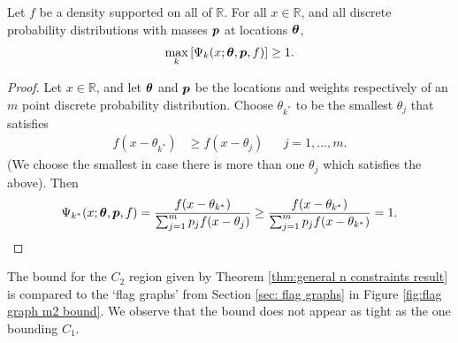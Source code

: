 
		\begin{lemma}
		\label{lem:maxkGamma}
		Let $f$ be a density supported on all of $\mathbb{R}$. For all $x \in \mathbb{R}$, and all discrete probability distributions with masses ${\bm{{p}}}$ at locations ${\bm{{\theta}}}$,
			\begin{equation}
				\max_k \left[ \Psi_k(x;{\bm{{\theta}}},{\bm{{p}}},f) \right] \geq 1.
			\end{equation}
		\end{lemma}	
		\begin{proof}
			Let $x \in \mathbb{R}$, and let ${\bm{{\theta}}}$ and ${\bm{{p}}}$ be the locations and weights respectively of an $m$ point discrete probability distribution. Choose $\theta_{k^*}$ to be the smallest $\theta_j$ that satisfies
			\begin{align}
				f(x - \theta_{k^*}) &\geq f(x - \theta_j) && j = 1, \dots, m.
			\end{align}
			(We choose the smallest in case there is more than one $\theta_j$ which satisfies the above). Then
			\begin{equation}
				\Psi_{k^*}(x;{\bm{{\theta}}},{\bm{{p}}},f) = \frac{f(x - \theta_{k^*})}{\sum_{j=1}^m p_j f(x - \theta_j)} \geq \frac{f(x - \theta_{k^*})}{\sum_{j=1}^m p_j f(x - \theta_{k^*})} = 1.
			\end{equation}
		\end{proof}

		The bound for the $C_2$ region given by Theorem \ref{thm:general n constraints result} is compared to the `flag graphs' from Section \ref{sec: flag graphs} in Figure \ref{fig:flag graph m2 bound}. We observe that the bound does not appear as tight as the one bounding $C_1$.

